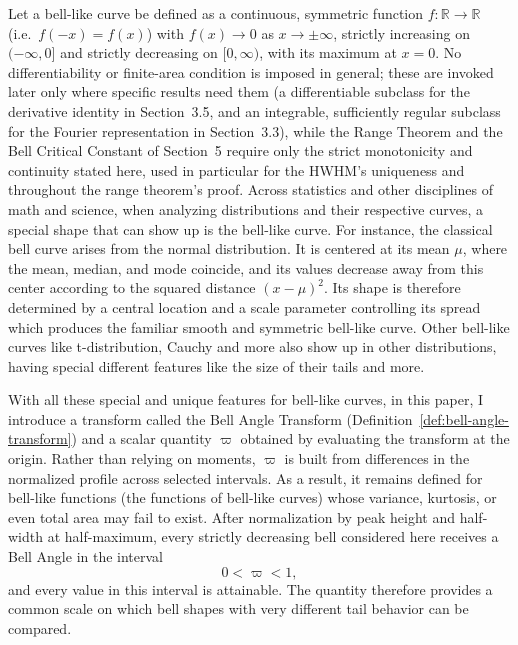 \documentclass[11pt]{article}
\theoremstyle{definition}
\theoremstyle{plain}
\theoremstyle{remark}
\begin{document}
Let a bell-like curve be defined as a continuous, symmetric function $f:\mathbb R\to\mathbb R$
(i.e.\ $f(-x)=f(x)$) with $f(x)\to0$ as $x\to \pm \infty$, strictly increasing on
$(-\infty,0]$ and strictly decreasing on $[0,\infty)$, with its maximum at $x=0$. No
differentiability or finite-area condition is imposed in general; these are invoked
later only where specific results need them (a differentiable subclass for the
derivative identity in Section~3.5, and an integrable, sufficiently regular subclass
for the Fourier representation in Section~3.3), while the Range Theorem and the Bell
Critical Constant of Section~5 require only the strict monotonicity and continuity
stated here, used in particular for the HWHM's uniqueness and throughout the range
theorem's proof. Across statistics and other disciplines of math and science, when
analyzing distributions and their respective curves, a special shape that can show up
is the bell-like curve. For instance, the classical bell curve arises from the normal
distribution. It is centered at its mean $\mu$, where the mean, median, and mode
coincide, and its values decrease away from this center according to the squared
distance $\left(x-\mu\right)^2$. Its shape is therefore determined by a central
location and a scale parameter controlling its spread which produces the familiar
smooth and symmetric bell-like curve. Other bell-like curves like t-distribution,
Cauchy and more also show up in other distributions, having special different
features like the size of their tails and more.

With all these special and unique features for bell-like curves, in this paper, I introduce a transform called the Bell Angle Transform
(Definition~\ref{def:bell-angle-transform}) and a scalar quantity $\varpi$ obtained by
evaluating the transform at the origin. Rather than relying on moments, $\varpi$ is built
from differences in the normalized profile across selected intervals. As a result, it
remains defined for bell-like functions (the functions of bell-like curves) whose variance, kurtosis, or even total area
may fail to exist. After normalization by peak height and half-width at half-maximum,
every strictly decreasing bell considered here receives a Bell Angle in the interval
\[
0<\varpi<1,
\]
and every value in this interval is attainable. The quantity therefore provides a common
scale on which bell shapes with very different tail behavior can be compared.
\end{document}
